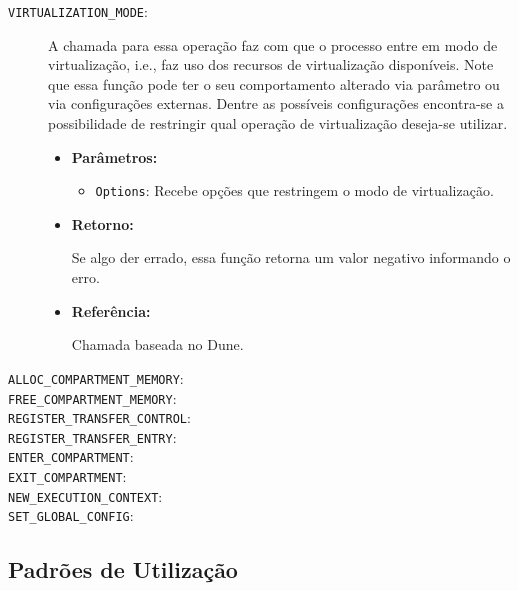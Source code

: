 \begin{description}
\begin{itemize}
  \end{itemize}

  \item [\texttt{VIRTUALIZATION\_MODE}:]

A chamada para essa operação faz com que o processo entre em modo de
virtualização, i.e., faz uso dos recursos de virtualização disponíveis. Note
que essa função pode ter o seu comportamento alterado via parâmetro ou via
configurações externas. Dentre as possíveis configurações encontra-se a
possibilidade de restringir qual operação de virtualização deseja-se utilizar.

  \begin{itemize}
    \item \textbf{Parâmetros:}

    \begin{itemize}
      \item \texttt{Options}: Recebe opções que restringem o modo de virtualização.
    \end{itemize}

    \item \textbf{Retorno:}

Se algo der errado, essa função retorna um valor negativo informando o erro.

    \item \textbf{Referência:}

Chamada baseada no Dune.

  \end{itemize}

  \item [\texttt{ALLOC\_COMPARTMENT\_MEMORY}:]
  \item [\texttt{FREE\_COMPARTMENT\_MEMORY}:]
  \item [\texttt{REGISTER\_TRANSFER\_CONTROL}:]
  \item [\texttt{REGISTER\_TRANSFER\_ENTRY}:]
  \item [\texttt{ENTER\_COMPARTMENT}:]
  \item [\texttt{EXIT\_COMPARTMENT}:]
  \item [\texttt{NEW\_EXECUTION\_CONTEXT}:]
  \item [\texttt{SET\_GLOBAL\_CONFIG}:]
\end{description}

\subsection{Padrões de Utilização}




